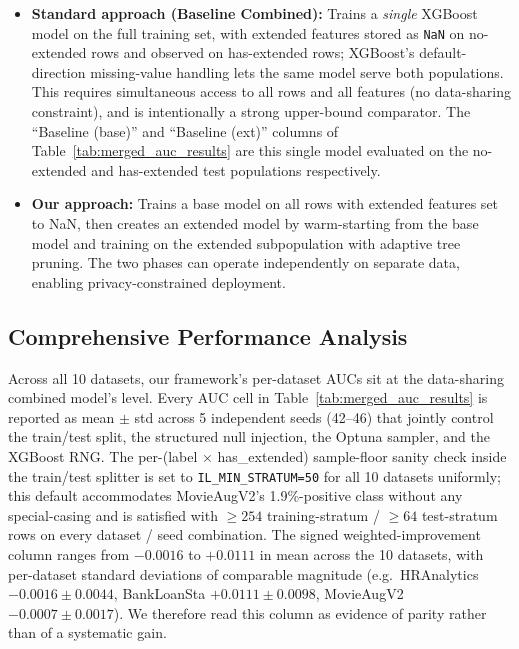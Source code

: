 \documentclass[sigconf]{acmart}
\begin{document}
\begin{itemize}
\begin{itemize}
\item \textbf{Standard approach (Baseline Combined):} Trains a \emph{single} XGBoost model on the full training set, with extended features stored as \texttt{NaN} on no-extended rows and observed on has-extended rows; XGBoost's default-direction missing-value handling lets the same model serve both populations. This requires simultaneous access to all rows and all features (no data-sharing constraint), and is intentionally a strong upper-bound comparator. The ``Baseline (base)'' and ``Baseline (ext)'' columns of Table~\ref{tab:merged_auc_results} are this single model evaluated on the no-extended and has-extended test populations respectively.
\item \textbf{Our approach:} Trains a base model on all rows with extended features set to NaN, then creates an extended model by warm-starting from the base model and training on the extended subpopulation with adaptive tree pruning. The two phases can operate independently on separate data, enabling privacy-constrained deployment.
\end{itemize}

\subsection{Comprehensive Performance Analysis}

Across all 10 datasets, our framework's per-dataset AUCs sit at the data-sharing combined model's level. Every AUC cell in Table~\ref{tab:merged_auc_results} is reported as mean $\pm$ std across 5 independent seeds (42--46) that jointly control the train/test split, the structured null injection, the Optuna sampler, and the XGBoost RNG. The per-(label $\times$ has\_extended) sample-floor sanity check inside the train/test splitter is set to \texttt{IL\_MIN\_STRATUM=50} for all 10 datasets uniformly; this default accommodates MovieAugV2's 1.9\%-positive class without any special-casing and is satisfied with $\geq 254$ training-stratum / $\geq 64$ test-stratum rows on every dataset / seed combination. The signed weighted-improvement column ranges from $-0.0016$ to $+0.0111$ in mean across the 10 datasets, with per-dataset standard deviations of comparable magnitude (e.g.\ HRAnalytics $-0.0016 \pm 0.0044$, BankLoanSta $+0.0111 \pm 0.0098$, MovieAugV2 $-0.0007 \pm 0.0017$). We therefore read this column as evidence of parity rather than of a systematic gain.


\end{itemize}
\end{document}
